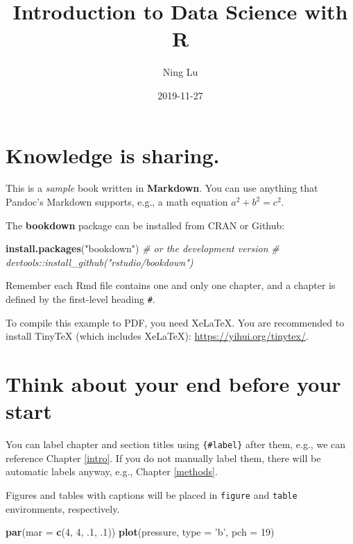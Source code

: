 \documentclass[]{book}
\title{Introduction to Data Science with R}
\author{Ning Lu}
\date{2019-11-27}
\newenvironment{Shaded}{\begin{snugshade}}{\end{snugshade}}
\newcommand{\CommentTok}[1]{\textcolor[rgb]{0.56,0.35,0.01}{\textit{#1}}}
\newcommand{\DataTypeTok}[1]{\textcolor[rgb]{0.13,0.29,0.53}{#1}}
\newcommand{\DecValTok}[1]{\textcolor[rgb]{0.00,0.00,0.81}{#1}}
\newcommand{\FloatTok}[1]{\textcolor[rgb]{0.00,0.00,0.81}{#1}}
\newcommand{\KeywordTok}[1]{\textcolor[rgb]{0.13,0.29,0.53}{\textbf{#1}}}
\newcommand{\NormalTok}[1]{#1}
\newcommand{\StringTok}[1]{\textcolor[rgb]{0.31,0.60,0.02}{#1}}
\begin{document}
\maketitle

{
\setcounter{tocdepth}{1}
\tableofcontents
}
\hypertarget{knowledge-is-sharing.}{%
\chapter{Knowledge is sharing.}\label{knowledge-is-sharing.}}

This is a \emph{sample} book written in \textbf{Markdown}. You can use anything that Pandoc's Markdown supports, e.g., a math equation \(a^2 + b^2 = c^2\).

The \textbf{bookdown} package can be installed from CRAN or Github:

\begin{Shaded}
\begin{Highlighting}[]
\KeywordTok{install.packages}\NormalTok{(}\StringTok{"bookdown"}\NormalTok{)}
\CommentTok{# or the development version}
\CommentTok{# devtools::install_github("rstudio/bookdown")}
\end{Highlighting}
\end{Shaded}

Remember each Rmd file contains one and only one chapter, and a chapter is defined by the first-level heading \texttt{\#}.

To compile this example to PDF, you need XeLaTeX. You are recommended to install TinyTeX (which includes XeLaTeX): \url{https://yihui.org/tinytex/}.

\hypertarget{think-about-your-end-before-your-start}{%
\chapter{Think about your end before your start}\label{think-about-your-end-before-your-start}}

You can label chapter and section titles using \texttt{\{\#label\}} after them, e.g., we can reference Chapter \ref{intro}. If you do not manually label them, there will be automatic labels anyway, e.g., Chapter \ref{methods}.

Figures and tables with captions will be placed in \texttt{figure} and \texttt{table} environments, respectively.

\begin{Shaded}
\begin{Highlighting}[]
\KeywordTok{par}\NormalTok{(}\DataTypeTok{mar =} \KeywordTok{c}\NormalTok{(}\DecValTok{4}\NormalTok{, }\DecValTok{4}\NormalTok{, }\FloatTok{.1}\NormalTok{, }\FloatTok{.1}\NormalTok{))}
\KeywordTok{plot}\NormalTok{(pressure, }\DataTypeTok{type =} \StringTok{'b'}\NormalTok{, }\DataTypeTok{pch =} \DecValTok{19}\NormalTok{)}
\end{Highlighting}
\end{Shaded}
\end{document}
